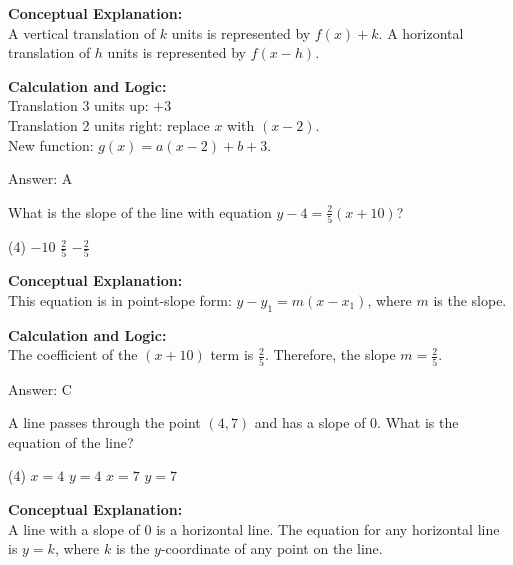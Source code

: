 \documentclass[11pt,paper=a4,answers]{exam}
\begin{document}
\begin{questions}
\begin{solution}
\textbf{Conceptual Explanation:} \\
A vertical translation of $k$ units is represented by $f(x) + k$. A horizontal translation of $h$ units is represented by $f(x - h)$.

\vspace{10pt}
\textbf{Calculation and Logic:} \\
Translation 3 units up: $+3$ \\
Translation 2 units right: replace $x$ with $(x - 2)$. \\
New function: $g(x) = a(x - 2) + b + 3$.

\vspace{15pt}
Answer: \colorbox{yellow!100}{A}
\end{solution}

\vspace{20pt}

\question
What is the slope of the line with equation $y - 4 = \frac{2}{5}(x + 10)$?
\begin{tasks}(4)
    \task $-10$
    \task $\frac{2}{5}$
    \task $-\frac{2}{5}$
\end{tasks}

\begin{solution}
\textbf{Conceptual Explanation:} \\
This equation is in point-slope form: $y - y_1 = m(x - x_1)$, where $m$ is the slope.

\vspace{10pt}
\textbf{Calculation and Logic:} \\
The coefficient of the $(x + 10)$ term is $\frac{2}{5}$. Therefore, the slope $m = \frac{2}{5}$.

\vspace{15pt}
Answer: \colorbox{yellow!100}{C}
\end{solution}

\vspace{20pt}

\question
A line passes through the point $(4, 7)$ and has a slope of 0. What is the equation of the line?
\begin{tasks}(4)
    \task $x = 4$
    \task $y = 4$
    \task $x = 7$
    \task $y = 7$
\end{tasks}

\begin{solution}
\textbf{Conceptual Explanation:} \\
A line with a slope of 0 is a horizontal line. The equation for any horizontal line is $y = k$, where $k$ is the $y$-coordinate of any point on the line.


\end{solution}
\end{questions}
\end{document}

